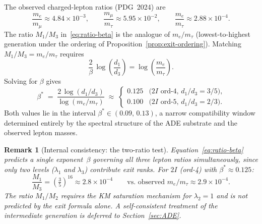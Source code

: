 \documentclass[11pt,a4paper]{article}
\newtheorem{remark}[theorem]{Remark}
\begin{document}
      The observed charged-lepton ratios (PDG~2024) are
      \begin{equation}
        \label{eq:lepton-ratios}
        \frac{m_e}{m_\mu} \approx 4.84 \times 10^{-3},
        \qquad
        \frac{m_\mu}{m_\tau} \approx 5.95 \times 10^{-2},
        \qquad
        \frac{m_e}{m_\tau} \approx 2.88 \times 10^{-4}.
      \end{equation}
      The ratio $M_1/M_3$ in~\eqref{eq:ratio-beta} is the analogue of $m_e/m_\tau$
      (lowest-to-highest generation under the ordering of
      Proposition~\ref{prop:exit-ordering}).
      Matching $M_1/M_3 = m_e/m_\tau$ requires
      \begin{equation}
        \label{eq:beta-match}
        \frac{2}{\beta}\,\log\!\left(\frac{d_1}{d_3}\right)
        = \log\!\left(\frac{m_e}{m_\tau}\right).
      \end{equation}
      Solving for $\beta$ gives
      \begin{equation}
        \label{eq:beta-window}
        \beta^* \;=\;
        \frac{2\,\log(d_1/d_3)}{\log(m_e/m_\tau)}
        \;\approx\;
        \begin{cases}
          0.125 & \text{($2I$ ord-4, $d_1/d_3 = 3/5$),}\\[4pt]
          0.100 & \text{($2I$ ord-5, $d_1/d_3 = 2/3$).}
        \end{cases}
      \end{equation}
      Both values lie in the interval $\beta^{*} \in (0.09,\, 0.13)$,
      a narrow compatibility window determined entirely by the spectral structure
      of the ADE substrate and the observed lepton masses.

      \begin{remark}[Internal consistency: the two-ratio test]
        \label{rem:two-ratio}
        Equation~\eqref{eq:ratio-beta} predicts a single exponent~$\beta$ governing
        all three lepton ratios simultaneously, since only two levels ($\lambda_1$
        and $\lambda_3$) contribute exit ranks.
        For $2I$ (ord-4) with $\beta^{*} \approx 0.125$:
        \begin{equation}
          \frac{M_1}{M_3} = \left(\tfrac{3}{5}\right)^{16}
          \approx 2.8 \times 10^{-4}
          \qquad \text{vs.\ observed } m_e/m_\tau \approx 2.9 \times 10^{-4}.
        \end{equation}
        The ratio $M_1/M_2$ requires the KM saturation mechanism for $\lambda_2 = 1$
        and is not predicted by the exit formula alone.
        A self-consistent treatment of the intermediate generation
        is deferred to Section~\ref{sec:ADE}.
      \end{remark}
\end{document}
